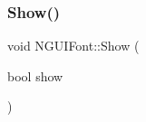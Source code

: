 \hypertarget{class_n_g_u_i_font_a5a719761f35fbf8dade6ac0a783e526c}{}\label{class_n_g_u_i_font_a5a719761f35fbf8dade6ac0a783e526c} 
\subsubsection{\texorpdfstring{Show()}{Show()}}
{\footnotesize\ttfamily void N\+G\+U\+I\+Font\+::\+Show (\begin{DoxyParamCaption}\item[{bool}]{show }\end{DoxyParamCaption})}

